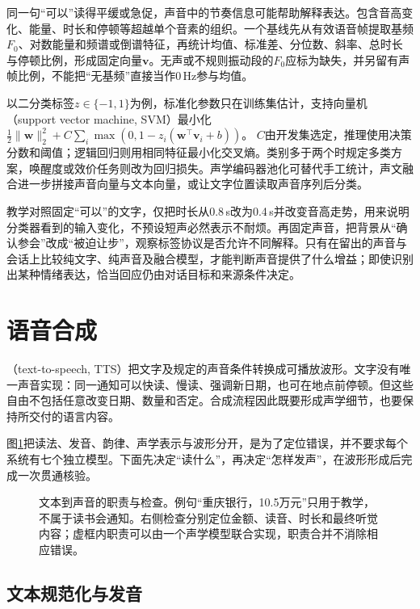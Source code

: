 同一句“可以”读得平缓或急促，声音中的节奏信息可能帮助解释表达。包含音高变化、能量、时长和停顿等超越单个音素的组织。一个基线先从有效语音帧提取基频$F_0$、对数能量和频谱或倒谱特征，再统计均值、标准差、分位数、斜率、总时长与停顿比例，形成固定向量$\bm{v}$。无声或不规则振动段的$F_0$应标为缺失，并另留有声帧比例，不能把“无基频”直接当作0\,Hz参与均值。

以二分类标签$z\in\{-1,1\}$为例，标准化参数只在训练集估计，支持向量机（support vector machine, SVM）最小化
$\frac12\lVert\bm{w}\rVert_2^2+C\sum_i\max(0,1-z_i(\bm{w}^{\top}\bm{v}_i+b))$。
$C$由开发集选定，推理使用决策分数和阈值；逻辑回归则用相同特征最小化交叉熵。类别多于两个时规定多类方案，唤醒度或效价任务则改为回归损失。声学编码器池化可替代手工统计，声文融合进一步拼接声音向量与文本向量，或让文字位置读取声音序列后分类。

教学对照固定“可以”的文字，仅把时长从0.8\,s改为0.4\,s并改变音高走势，用来说明分类器看到的输入变化，不预设短声必然表示不耐烦。再固定声音，把背景从“确认参会”改成“被迫让步”，观察标签协议是否允许不同解释。只有在留出的声音与会话上比较纯文字、纯声音及融合模型，才能判断声音提供了什么增益；即使识别出某种情绪表达，恰当回应仍由对话目标和来源条件决定。

\section{语音合成}
\label{sec:nlp-speech-tts}

（text-to-speech, TTS）把文字及规定的声音条件转换成可播放波形。文字没有唯一声音实现：同一通知可以快读、慢读、强调新日期，也可在地点前停顿。但这些自由不包括任意改变日期、数量和否定。合成流程因此既要形成声学细节，也要保持所交付的语言内容。

图\ref{fig:nlp-speech-synthesis}把读法、发音、韵律、声学表示与波形分开，是为了定位错误，并不要求每个系统有七个独立模型。下面先决定“读什么”，再决定“怎样发声”，在波形形成后完成一次贯通核验。

\begin{figure}[htbp]
  \centering
  
  \caption{文本到声音的职责与检查。例句“重庆银行，10.5万元”只用于教学，不属于读书会通知。右侧检查分别定位金额、读音、时长和最终听觉内容；虚框内职责可以由一个声学模型联合实现，职责合并不消除相应错误。}
  \label{fig:nlp-speech-synthesis}
\end{figure}
\FloatBarrier

\subsection{文本规范化与发音}
\label{sec:nlp-speech-normalization}

